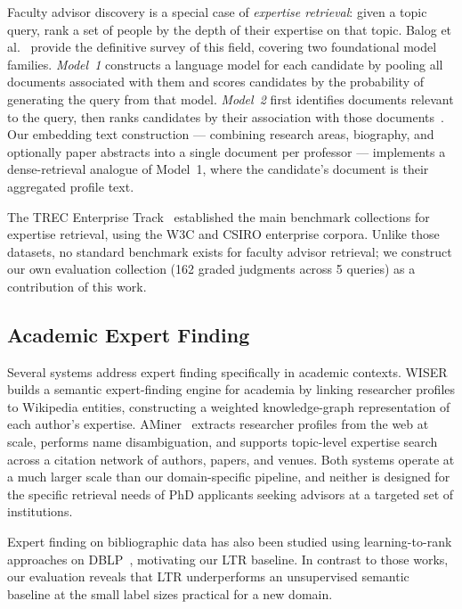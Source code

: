 \documentclass[11pt,a4paper]{article}
\begin{document}
Faculty advisor discovery is a special case of \emph{expertise retrieval}:
given a topic query, rank a set of people by the depth of their expertise on
that topic. Balog et al.~\cite{balog2012expertise} provide the definitive
survey of this field, covering two foundational model families.
\emph{Model~1} constructs a language model for each candidate by pooling all
documents associated with them and scores candidates by the probability of
generating the query from that model.
\emph{Model~2} first identifies documents relevant to the query, then
ranks candidates by their association with those documents~\cite{balog2006formal}.
Our embedding text construction --- combining research areas, biography, and
optionally paper abstracts into a single document per professor --- implements
a dense-retrieval analogue of Model~1, where the candidate's document is their
aggregated profile text.

The TREC Enterprise Track~\cite{craswell2005trec} established the main
benchmark collections for expertise retrieval, using the W3C and CSIRO
enterprise corpora. Unlike those datasets, no standard benchmark exists for
faculty advisor retrieval; we construct our own evaluation collection
(162 graded judgments across 5 queries) as a contribution of this work.

\subsection{Academic Expert Finding}

Several systems address expert finding specifically in academic contexts.
WISER~\cite{cifariello2019wiser} builds a semantic expert-finding engine for
academia by linking researcher profiles to Wikipedia entities, constructing a
weighted knowledge-graph representation of each author's expertise.
AMiner~\cite{tang2008arnetminer} extracts researcher profiles from the web at
scale, performs name disambiguation, and supports topic-level expertise search
across a citation network of authors, papers, and venues. Both systems operate
at a much larger scale than our domain-specific pipeline, and neither is
designed for the specific retrieval needs of PhD applicants seeking advisors at
a targeted set of institutions.

Expert finding on bibliographic data has also been studied using
learning-to-rank approaches on DBLP~\cite{deng2008expert}, motivating our LTR
baseline. In contrast to those works, our evaluation reveals that LTR
underperforms an unsupervised semantic baseline at the small label sizes
practical for a new domain.
\end{document}
